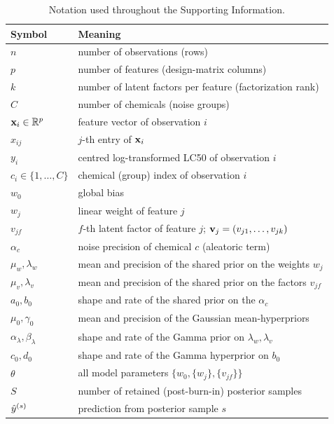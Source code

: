 \begin{table}[htbp]
\centering
\caption{Notation used throughout the Supporting Information.}
\label{tab:notation}
\small
\begin{tabular}{ll}
\toprule
\textbf{Symbol} & \textbf{Meaning} \\
\midrule
$n$ & number of observations (rows) \\
$p$ & number of features (design-matrix columns) \\
$k$ & number of latent factors per feature (factorization rank) \\
$C$ & number of chemicals (noise groups) \\
$\mathbf{x}_i \in \mathbb{R}^{p}$ & feature vector of observation $i$ \\
$x_{ij}$ & $j$-th entry of $\mathbf{x}_i$ \\
$y_i$ & centred log-transformed LC50 of observation $i$ \\
$c_i \in \{1,\dots,C\}$ & chemical (group) index of observation $i$ \\
$w_0$ & global bias \\
$w_j$ & linear weight of feature $j$ \\
$v_{jf}$ & $f$-th latent factor of feature $j$; $\mathbf{v}_j=(v_{j1},\dots,v_{jk})$ \\
$\alpha_c$ & noise precision of chemical $c$ (aleatoric term) \\
$\mu_w,\lambda_w$ & mean and precision of the shared prior on the weights $w_j$ \\
$\mu_v,\lambda_v$ & mean and precision of the shared prior on the factors $v_{jf}$ \\
$a_0,b_0$ & shape and rate of the shared prior on the $\alpha_c$ \\
$\mu_0,\gamma_0$ & mean and precision of the Gaussian mean-hyperpriors \\
$\alpha_\lambda,\beta_\lambda$ & shape and rate of the Gamma prior on $\lambda_w,\lambda_v$ \\
$c_0,d_0$ & shape and rate of the Gamma hyperprior on $b_0$ \\
$\theta$ & all model parameters $\{w_0,\{w_j\},\{v_{jf}\}\}$ \\
$S$ & number of retained (post-burn-in) posterior samples \\
$\hat{y}^{(s)}$ & prediction from posterior sample $s$ \\
\bottomrule
\end{tabular}
\end{table}

